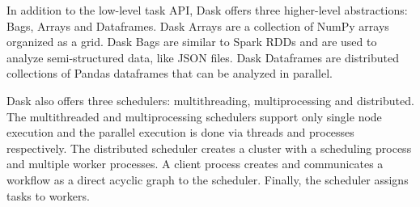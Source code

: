 In addition to the low-level task API, Dask offers three higher-level
abstractions: Bags, Arrays and Dataframes. Dask Arrays are a collection of NumPy
arrays organized as a grid. Dask Bags are similar to Spark RDDs and are used to
analyze semi-structured data, like JSON files. Dask Dataframes are distributed
collections of Pandas dataframes that can be analyzed in parallel.

Dask also offers three schedulers: multithreading, multiprocessing and
distributed. The multithreaded and multiprocessing schedulers support only
single node execution and the parallel execution is done via threads and processes
respectively. The distributed scheduler creates a cluster with a scheduling
process and multiple worker processes. A client process creates and communicates
a workflow as a direct acyclic graph to the scheduler. Finally, the scheduler
assigns tasks to workers.




